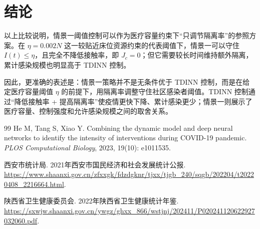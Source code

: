 \documentclass[UTF8,12pt,a4paper]{ctexart}
\numberwithin{equation}{section}
\begin{document}
\section{结论}

以上比较说明，情景一阈值控制可以作为医疗容量约束下“只调节隔离率”的参照方案。在 $\eta=0.002N$ 这一较贴近床位资源约束的代表阈值下，情景一可以守住 $I(t)\le \eta$，且完全不降低接触率，即 $J_c=0$；但它需要较长时间维持额外隔离，累计感染规模也明显高于 TDINN 控制。

因此，更准确的表述是：情景一策略并不是无条件优于 TDINN 控制，而是在给定医疗容量阈值 $\eta$ 的前提下，用隔离率调整守住社区感染者阈值。TDINN 控制通过“降低接触率 + 提高隔离率”使疫情更快下降、累计感染更少；情景一则展示了医疗容量、控制强度和允许感染规模之间的取舍关系。

\begin{thebibliography}{99}
He M, Tang S, Xiao Y.
Combining the dynamic model and deep neural networks to identify the intensity of interventions during COVID-19 pandemic.
\textit{PLOS Computational Biology}, 2023, 19(10): e1011535.

西安市统计局.
2021年西安市国民经济和社会发展统计公报.
\url{https://www.shaanxi.gov.cn/zfxxgk/fdzdgknr/tjxx/tjgb_240/sqgb/202204/t20220408_2216664.html}.

陕西省卫生健康委员会.
2022年陕西省卫生健康统计年鉴.
\url{https://sxwjw.shaanxi.gov.cn/ywgz/ghxx_866/wstjnj/202411/P020241120622927032060.pdf}.
\end{thebibliography}
\end{document}
